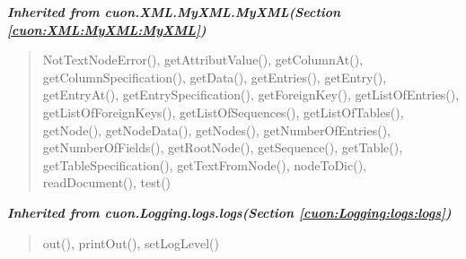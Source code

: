 \large{\textbf{\textit{Inherited from cuon.XML.MyXML.MyXML\textit{(Section \ref{cuon:XML:MyXML:MyXML})}}}}

\begin{quote}
NotTextNodeError(), getAttributValue(), getColumnAt(), getColumnSpecification(), getData(), getEntries(), getEntry(), getEntryAt(), getEntrySpecification(), getForeignKey(), getListOfEntries(), getListOfForeignKeys(), getListOfSequences(), getListOfTables(), getNode(), getNodeData(), getNodes(), getNumberOfEntries(), getNumberOfFields(), getRootNode(), getSequence(), getTable(), getTableSpecification(), getTextFromNode(), nodeToDic(), readDocument(), test()
\end{quote}

\large{\textbf{\textit{Inherited from cuon.Logging.logs.logs\textit{(Section \ref{cuon:Logging:logs:logs})}}}}

\begin{quote}
out(), printOut(), setLogLevel()
\end{quote}
